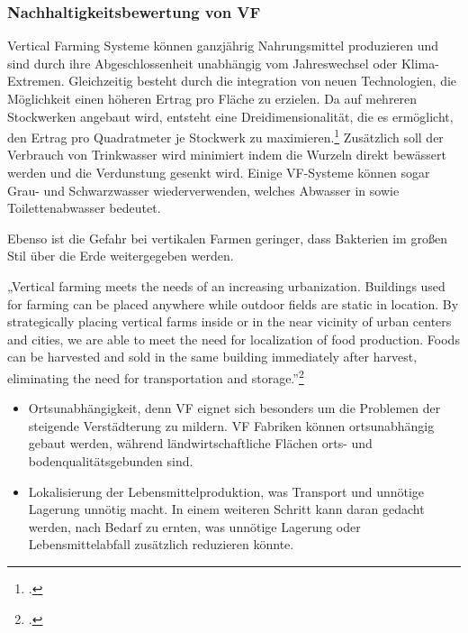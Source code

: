 \documentclass{scrartcl}
\begin{document}
\subsubsection {Nachhaltigkeitsbewertung von VF}

Vertical Farming Systeme können ganzjährig Nahrungsmittel produzieren und sind durch ihre Abgeschlossenheit unabhängig vom Jahreswechsel oder Klima-Extremen. Gleichzeitig besteht durch die integration von neuen Technologien, die Möglichkeit einen höheren Ertrag pro Fläche zu erzielen. Da auf mehreren Stockwerken angebaut wird, entsteht eine Dreidimensionalität, die es ermöglicht, den Ertrag pro Quadratmeter je Stockwerk zu maximieren.\footcite{Despommier2010TheCentury.} Zusätzlich soll der Verbrauch von Trinkwasser wird minimiert indem die Wurzeln direkt bewässert werden und die Verdunstung gesenkt wird. Einige VF-Systeme können sogar Grau- und Schwarzwasser wiederverwenden, welches Abwasser in sowie Toilettenabwasser bedeutet. 

Ebenso ist die Gefahr bei vertikalen Farmen geringer, dass Bakterien im großen Stil über die Erde weitergegeben werden.

\begin{displayquote}
„Vertical farming meets the needs of an increasing urbanization. Buildings used for farming can be placed anywhere while outdoor fields are static in location. By strategically placing vertical farms inside or in the near vicinity of urban centers and cities, we are able to meet the need for localization of food production. Foods can be harvested and sold in the same building immediately after harvest, eliminating the need for transportation and storage.”\footcite[S.7]{PeterMollerVoss2013VerticalRise}
\end{displayquote}

\begin{itemize}
\item Ortsunabhängigkeit, denn VF eignet sich besonders um die Problemen der steigende Verstädterung zu mildern. VF Fabriken können ortsunabhängig gebaut werden, während  ländwirtschaftliche Flächen orts- und bodenqualitätsgebunden sind.
    \item Lokalisierung der Lebensmittelproduktion, was Transport und unnötige Lagerung unnötig macht. In einem weiteren Schritt kann daran gedacht werden, nach Bedarf zu ernten, was unnötige Lagerung oder Lebensmittelabfall zusätzlich reduzieren könnte.
\end{itemize}
\end{document}
